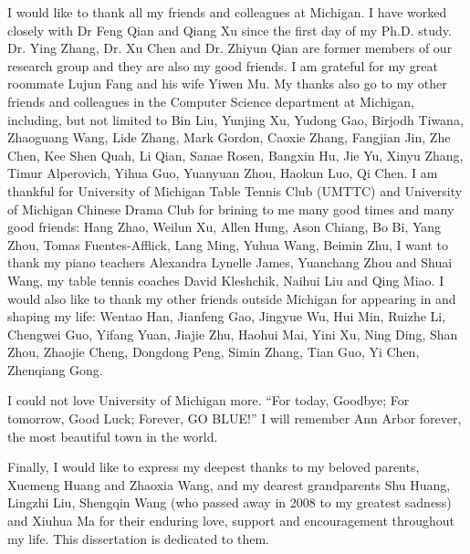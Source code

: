 I would like to thank all my friends and colleagues at Michigan. I have worked closely with Dr Feng Qian and Qiang Xu since the first day of my Ph.D. study. Dr. Ying Zhang, Dr. Xu Chen and Dr. Zhiyun Qian are former members of our research group and they are also my good friends. I am grateful for my great roommate Lujun Fang and his wife Yiwen Mu. My thanks also go to my other friends and colleagues in the Computer Science department at Michigan, including, but not limited to Bin Liu, Yunjing Xu, Yudong Gao, Birjodh Tiwana, Zhaoguang Wang, Lide Zhang, Mark Gordon, Caoxie Zhang, Fangjian Jin, Zhe Chen, Kee Shen Quah, Li Qian, Sanae Rosen, Bangxin Hu, Jie Yu, Xinyu Zhang, Timur Alperovich, Yihua Guo, Yuanyuan Zhou, Haokun Luo, Qi Chen. I am thankful for University of Michigan Table Tennis Club (UMTTC) and University of Michigan Chinese Drama Club for brining to me many good times and many good friends: Hang Zhao, Weilun Xu, Allen Hung, Ason Chiang, Bo Bi, Yang Zhou, Tomas Fuentes-Afflick, Lang Ming, Yuhua Wang, Beimin Zhu, \etc I want to thank my piano teachers Alexandra Lynelle James, Yuanchang Zhou and Shuai Wang, my table tennis coaches David Kleshchik, Naihui Liu and Qing Miao. I would also like to thank my other friends outside Michigan for appearing in and shaping my life: Wentao Han, Jianfeng Gao, Jingyue Wu, Hui Min, Ruizhe Li, Chengwei Guo, Yifang Yuan, Jiajie Zhu, Haohui Mai, Yini Xu, Ning Ding, Shan Zhou, Zhaojie Cheng, Dongdong Peng, Simin Zhang, Tian Guo, Yi Chen, Zhenqiang Gong.

I could not love University of Michigan more. ``For today, Goodbye; For tomorrow, Good Luck; Forever, GO BLUE!'' I will remember Ann Arbor forever, the most beautiful town in the world.

Finally, I would like to express my deepest thanks to my beloved parents, Xuemeng Huang and Zhaoxia Wang, and my dearest grandparents Shu Huang, Lingzhi Liu, Shengqin Wang (who passed away in 2008 to my greatest sadness) and Xiuhua Ma for their enduring love, support and encouragement throughout my life. This dissertation is dedicated to them.

\label{ACKNOWLEDGEMENTS}
